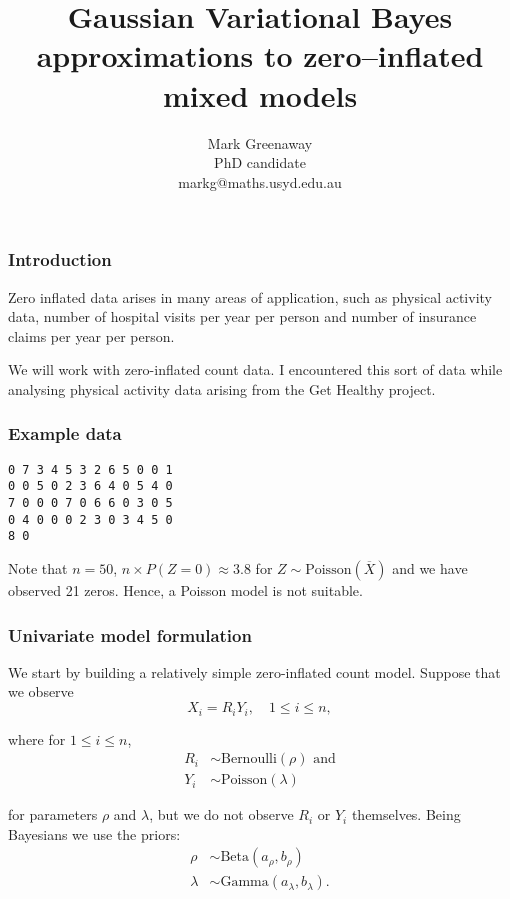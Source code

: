 \documentclass{beamer}
\title{Gaussian Variational Bayes approximations to zero--inflated mixed models}
\author{Mark Greenaway\\PhD candidate\\markg@maths.usyd.edu.au}
\begin{document}
\begin{frame}
\titlepage
\end{frame}

\begin{frame}
\frametitle{Introduction}
Zero inflated data arises in many areas of application, such as physical
activity data, number of hospital visits per year per person and
number of insurance claims per year per person.

\bigskip 
We will work with zero-inflated count data. I encountered this sort of data 
while analysing physical activity data arising from the Get Healthy project.
\end{frame}

\begin{frame}[fragile]
\frametitle{Example data}
\begin{verbatim}
0 7 3 4 5 3 2 6 5 0 0 1
0 0 5 0 2 3 6 4 0 5 4 0
7 0 0 0 7 0 6 6 0 3 0 5
0 4 0 0 0 2 3 0 3 4 5 0
8 0
\end{verbatim}

\noindent Note that $n=50$, 
$n\times P(Z = 0) \approx 3.8$ for $Z\sim\mbox{Poisson}(\overline{X})$
and we have observed 21 zeros. Hence,
a Poisson model is not suitable.

\end{frame}

\begin{frame}
\frametitle{Univariate model formulation}

We start by building a relatively simple zero-inflated count model. Suppose that we observe
$$
X_i = R_i Y_i, \quad 1\le i\le n,
$$

\noindent where for $1\le i\le n$,
\begin{align*} 
R_i &\sim \text{Bernoulli}(\rho) \text{ and}\\
Y_i &\sim \text{Poisson}(\lambda)
\end{align*}

\noindent for parameters $\rho$ and $\lambda$,
but we do not observe $R_i$ or $Y_i$ themselves.
Being Bayesians we use the priors:
\begin{align*} 
\rho &\sim \text{Beta}(a_\rho, b_\rho) \\
\lambda &\sim \text{Gamma}(a_\lambda, b_\lambda).
\end{align*}

\end{frame}
\end{document}

